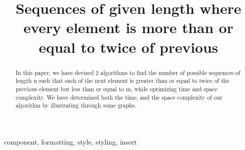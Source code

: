 \documentclass[conference]{IEEEtran}
\begin{document}
\title{Sequences of given length where every element is more than or equal to twice of previous\\
}

\author{
\and
{}
\and
{}
}

\maketitle

\begin{abstract}
In this paper, we have devised 2 algorithms to find the number of possible sequences of length n such that each of the next element is greater than or equal to twice of the previous element but less than or equal to m, while optimizing time and space complexity. We have determined both the time, and the space complexity of our algorithm by illustrating through some graphs.
\end{abstract}

\begin{IEEEkeywords}
component, formatting, style, styling, insert
\end{IEEEkeywords}
\end{document}
